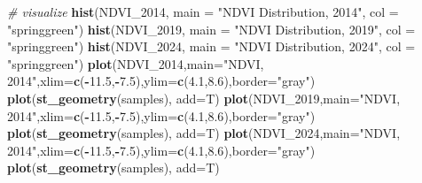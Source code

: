 \documentclass[
]{article}
\newenvironment{Shaded}{\begin{snugshade}}{\end{snugshade}}
\newcommand{\AttributeTok}[1]{\textcolor[rgb]{0.13,0.29,0.53}{#1}}
\newcommand{\CommentTok}[1]{\textcolor[rgb]{0.56,0.35,0.01}{\textit{#1}}}
\newcommand{\FloatTok}[1]{\textcolor[rgb]{0.00,0.00,0.81}{#1}}
\newcommand{\FunctionTok}[1]{\textcolor[rgb]{0.13,0.29,0.53}{\textbf{#1}}}
\newcommand{\NormalTok}[1]{#1}
\newcommand{\SpecialCharTok}[1]{\textcolor[rgb]{0.81,0.36,0.00}{\textbf{#1}}}
\newcommand{\StringTok}[1]{\textcolor[rgb]{0.31,0.60,0.02}{#1}}
\begin{document}
\begin{Shaded}
\begin{Highlighting}[]
\CommentTok{\# visualize}
\FunctionTok{hist}\NormalTok{(NDVI\_2014, }\AttributeTok{main =} \StringTok{"NDVI Distribution, 2014"}\NormalTok{, }\AttributeTok{col =} \StringTok{"springgreen"}\NormalTok{) }
\FunctionTok{hist}\NormalTok{(NDVI\_2019, }\AttributeTok{main =} \StringTok{"NDVI Distribution, 2019"}\NormalTok{, }\AttributeTok{col =} \StringTok{"springgreen"}\NormalTok{)}
\FunctionTok{hist}\NormalTok{(NDVI\_2024, }\AttributeTok{main =} \StringTok{"NDVI Distribution, 2024"}\NormalTok{, }\AttributeTok{col =} \StringTok{"springgreen"}\NormalTok{)}
\FunctionTok{plot}\NormalTok{(NDVI\_2014,}\AttributeTok{main=}\StringTok{"NDVI, 2014"}\NormalTok{,}\AttributeTok{xlim=}\FunctionTok{c}\NormalTok{(}\SpecialCharTok{{-}}\FloatTok{11.5}\NormalTok{,}\SpecialCharTok{{-}}\FloatTok{7.5}\NormalTok{),}\AttributeTok{ylim=}\FunctionTok{c}\NormalTok{(}\FloatTok{4.1}\NormalTok{,}\FloatTok{8.6}\NormalTok{),}\AttributeTok{border=}\StringTok{"gray"}\NormalTok{)}
\FunctionTok{plot}\NormalTok{(}\FunctionTok{st\_geometry}\NormalTok{(samples), }\AttributeTok{add=}\NormalTok{T)}
\FunctionTok{plot}\NormalTok{(NDVI\_2019,}\AttributeTok{main=}\StringTok{"NDVI, 2014"}\NormalTok{,}\AttributeTok{xlim=}\FunctionTok{c}\NormalTok{(}\SpecialCharTok{{-}}\FloatTok{11.5}\NormalTok{,}\SpecialCharTok{{-}}\FloatTok{7.5}\NormalTok{),}\AttributeTok{ylim=}\FunctionTok{c}\NormalTok{(}\FloatTok{4.1}\NormalTok{,}\FloatTok{8.6}\NormalTok{),}\AttributeTok{border=}\StringTok{"gray"}\NormalTok{)}
\FunctionTok{plot}\NormalTok{(}\FunctionTok{st\_geometry}\NormalTok{(samples), }\AttributeTok{add=}\NormalTok{T)}
\FunctionTok{plot}\NormalTok{(NDVI\_2024,}\AttributeTok{main=}\StringTok{"NDVI, 2014"}\NormalTok{,}\AttributeTok{xlim=}\FunctionTok{c}\NormalTok{(}\SpecialCharTok{{-}}\FloatTok{11.5}\NormalTok{,}\SpecialCharTok{{-}}\FloatTok{7.5}\NormalTok{),}\AttributeTok{ylim=}\FunctionTok{c}\NormalTok{(}\FloatTok{4.1}\NormalTok{,}\FloatTok{8.6}\NormalTok{),}\AttributeTok{border=}\StringTok{"gray"}\NormalTok{)}
\FunctionTok{plot}\NormalTok{(}\FunctionTok{st\_geometry}\NormalTok{(samples), }\AttributeTok{add=}\NormalTok{T)}
\end{Highlighting}
\end{Shaded}
\end{document}
